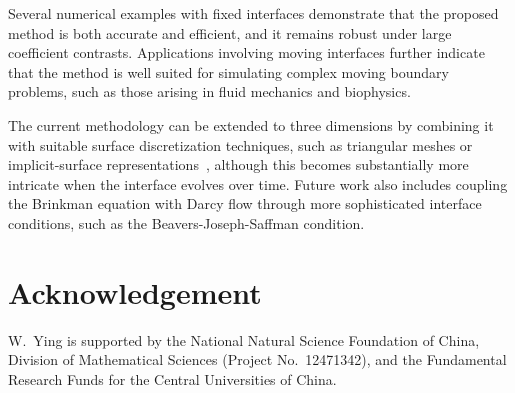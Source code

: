 \documentclass[preprint,11pt]{elsarticle}
\newtheorem{lemma}{Lemma}
\theoremstyle{remark}
\begin{document}
Several numerical examples with fixed interfaces demonstrate that the proposed method is both accurate and efficient, and it remains robust under large coefficient contrasts. 
Applications involving moving interfaces further indicate that the method is well suited for simulating complex moving boundary problems, such as those arising in fluid mechanics and biophysics.

The current methodology can be extended to three dimensions by combining it with suitable surface discretization techniques, such as triangular meshes or implicit-surface representations~\cite{Beale2006}, although this becomes substantially more intricate when the interface evolves over time. 
Future work also includes coupling the Brinkman equation with Darcy flow through more sophisticated interface conditions, such as the Beavers-Joseph-Saffman condition.








\section*{Acknowledgement}
W.~Ying is supported by the National Natural Science Foundation of China, Division of Mathematical Sciences (Project No.~12471342), and the Fundamental Research Funds for the Central Universities of China.



\end{document}
